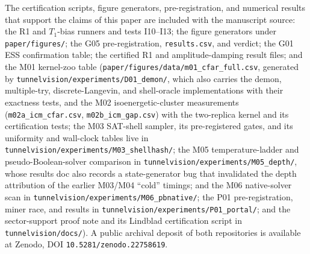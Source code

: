 \documentclass[aps,prx,reprint,floatfix,amsmath,amssymb,amsfonts]{revtex4-2}
\begin{document}
The certification scripts, figure generators, pre-registration, and
numerical results that support the claims of this paper are included
with the manuscript source: the R1 and $T_1$-bias runners and tests
I10--I13; the figure generators under \texttt{paper/figures/}; the G05
pre-registration, \texttt{results.csv}, and verdict; the G01 ESS
confirmation table; the certified R1 and amplitude-damping result
files; and the M01 kernel-zoo table
(\texttt{paper/figures/data/m01\_cfar\_full.csv}, generated by
\texttt{tunnelvision/experiments/D01\_demon/}, which also carries the
demon, multiple-try, discrete-Langevin, and shell-oracle
implementations with their exactness tests, and the M02
isoenergetic-cluster measurements
(\texttt{m02a\_icm\_cfar.csv}, \texttt{m02b\_icm\_gap.csv}) with
the two-replica kernel and its certification tests; the M03 SAT-shell
sampler, its pre-registered gates, and its uniformity and wall-clock
tables live in \texttt{tunnelvision/experiments/M03\_shellhash/}; the
M05 temperature-ladder and pseudo-Boolean-solver comparison in
\texttt{tunnelvision/experiments/M05\_depth/}, whose results doc also
records a state-generator bug that invalidated the depth attribution
of the earlier M03/M04 ``cold'' timings; and the M06 native-solver
scan in \texttt{tunnelvision/experiments/M06\_pbnative/}; the P01
pre-registration, miner race, and results in
\texttt{tunnelvision/experiments/P01\_portal/}; and the sector-support
proof note and its Lindblad certification script in
\texttt{tunnelvision/docs/}). A public archival deposit of both
repositories is available at Zenodo, DOI
\texttt{10.5281/zenodo.22758619}.


\end{document}
